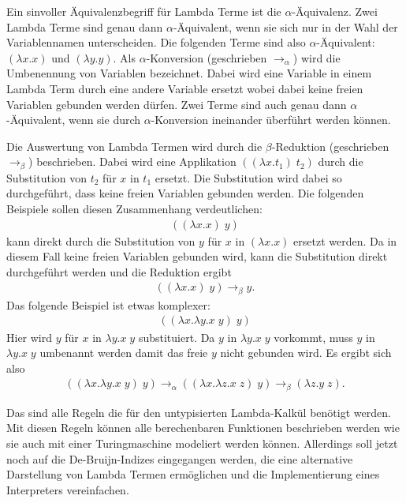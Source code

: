 \documentclass[ngerman]{article}
\newcommand{\doublelinebreak}{\par\vspace{\baselineskip}}
\begin{document}
\doublelinebreak

Ein sinvoller Äquivalenzbegriff für Lambda Terme ist die $\alpha$-Äquivalenz. Zwei Lambda Terme sind genau dann $\alpha$-Äquivalent, wenn sie sich nur in der Wahl der Variablennamen unterscheiden. Die folgenden Terme sind also $\alpha$-Äquivalent: $(\lambda x.x)$ und $(\lambda y.y)$.
Als $\alpha$-Konversion (geschrieben $\rightarrow_\alpha$) wird die Umbenennung von Variablen bezeichnet. Dabei wird eine Variable in einem Lambda Term durch eine andere Variable ersetzt wobei dabei keine freien Variablen gebunden werden dürfen. Zwei Terme sind auch genau dann $\alpha$-Äquivalent, wenn sie durch $\alpha$-Konversion ineinander überführt werden können.

\doublelinebreak

Die Auswertung von Lambda Termen wird durch die $\beta$-Reduktion (geschrieben $\rightarrow_\beta$) beschrieben.
Dabei wird eine Applikation $((\lambda x.t_1) \; t_2)$ durch die Substitution von $t_2$ für $x$ in $t_1$ ersetzt. Die Substitution wird dabei so durchgeführt, dass keine freien Variablen gebunden werden. Die folgenden Beispiele sollen diesen Zusammenhang verdeutlichen:
\begin{align*}
    ((\lambda x.x) \; y)
\end{align*}
kann direkt durch die Substitution von $y$ für $x$ in $(\lambda x.x)$ ersetzt werden. Da in diesem Fall keine freien Variablen gebunden wird, kann die Substitution direkt durchgeführt werden und die Reduktion ergibt
\begin{align*}
    ((\lambda x.x) \; y) \rightarrow_\beta y.
\end{align*}
Das folgende Beispiel ist etwas komplexer:
\begin{align*}
    ((\lambda x.\lambda y.x \; y) \; y)
\end{align*}
Hier wird $y$ für $x$ in $\lambda y.x \; y$ substituiert. Da $y$ in $\lambda y.x \; y$ vorkommt, muss $y$ in $\lambda y.x \; y$ umbenannt werden damit das freie $y$ nicht gebunden wird. Es ergibt sich also
\begin{align*}
    ((\lambda x.\lambda y.x \; y) \; y) \rightarrow_\alpha ((\lambda x.\lambda z.x \; z) \; y) \rightarrow_\beta (\lambda z.y \; z).
\end{align*}

\doublelinebreak
Das sind alle Regeln die für den untypisierten Lambda-Kalkül benötigt werden. Mit diesen Regeln können alle berechenbaren Funktionen beschrieben werden wie sie auch mit einer Turingmaschine modeliert werden können.
Allerdings soll jetzt noch auf die De-Bruijn-Indizes eingegangen werden, die eine alternative Darstellung von Lambda Termen ermöglichen und die Implementierung eines Interpreters vereinfachen.
\end{document}
